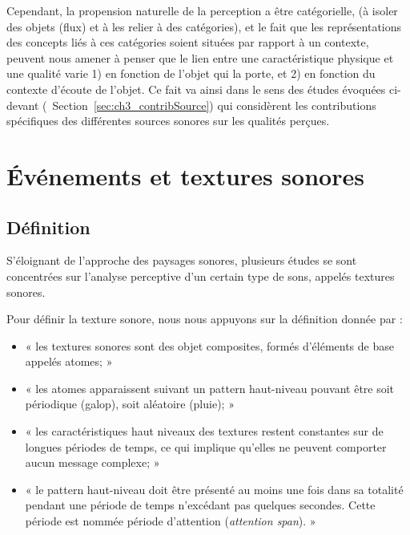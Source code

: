 Cependant, la propension naturelle de la perception a être catégorielle, (à isoler des objets (flux) et à les relier à des catégories), et le fait que les représentations des concepts liés à ces catégories soient situées par rapport à un contexte, peuvent nous amener à penser que le lien entre une caractéristique physique et une qualité varie 1) en fonction de l'objet qui la porte, et 2) en fonction du contexte d'écoute de l'objet. Ce fait va ainsi dans le sens des études évoquées ci-devant (\cf~Section~\ref{sec:ch3_contribSource}) qui considèrent les contributions spécifiques des différentes sources sonores sur les qualités perçues.


\section{Événements et textures sonores}
\label{sec:ch3_eventTexture}

\subsection{Définition}
\label{sec:ch3_textureDef}

S'éloignant de l'approche des paysages sonores, plusieurs études se sont concentrées sur l'analyse perceptive d'un certain type de sons, appelés textures sonores.

Pour définir la texture sonore, nous nous appuyons sur la définition donnée par \citep[p. 25]{saint1995classification}:  

\begin{itemize}
\item « les textures sonores sont des objet composites, formés d'éléments de base appelés atomes; »
\item « les atomes apparaissent suivant un pattern haut-niveau pouvant être soit périodique (galop), soit aléatoire (pluie); »
\item « les caractéristiques haut niveaux des textures restent constantes sur de longues périodes de temps, ce qui implique qu'elles ne peuvent comporter aucun message complexe; »
\item « le pattern haut-niveau doit être présenté au moins une fois dans sa totalité pendant une période de temps n’excédant pas quelques secondes. Cette période est nommée période d'attention (\emph{attention span}). »
\end{itemize}

